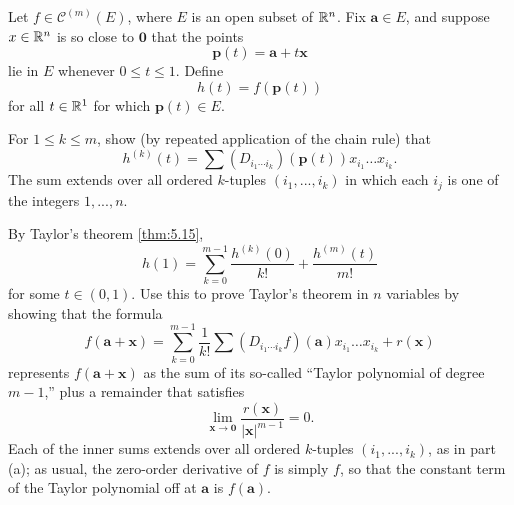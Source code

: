 \begin{myExercise}
    \label{ex:9.30}
    Let $f \in \mathscr{C}^{(m)} (E)$, 
    where $E$ is an open subset of ${\protect\mathbb R}^n$. 
    Fix $\mathbf{a} \in E$, and suppose $x \in {\protect\mathbb R}^n$ is so close to $\mathbf{0}$ that the points
    \begin{equation*}
        \mathbf{p}(t) = \mathbf{a} + t \mathbf{x}
    \end{equation*}
    lie in $E$ whenever $0 \leq t \leq 1$. 
    Define
    \begin{equation*}
        h(t) = f(\mathbf{p}(t))
    \end{equation*}
    for all $t \in {\protect\mathbb R}^1$ for which $\mathbf{p}(t) \in E$.
    \begin{asparaenum}[(a)]
        \item For $1 \leq k \leq m$, show (by repeated application of the chain rule) that 
        \begin{equation*}
            h^{(k)}(t) = \sum 
            \left( D_{i_1 \cdots i_k} \right) \left( \mathbf{p}(t) \right) 
            x_{i_1} \dots x_{i_k} .
        \end{equation*}
        The sum extends over all ordered $k$-tuples $(i_1, ... , i_k)$ in which each $i_j$ is one of the integers $1, ... , n$.
        \item By Taylor's theorem \ref{thm:5.15},
        \begin{equation*}
            h(1) = \sum_{k=0}^{m-1} \frac{h^{(k)}(0)}{k!} + \frac{h^{(m)}(t)}{m!}
        \end{equation*}
        for some $t \in (0, 1)$. 
        Use this to prove Taylor's theorem in $n$ variables by showing that the formula
        \begin{equation*}
            f(\mathbf{a+x}) = \sum_{k=0}^{m-1} \frac{1}{k!}
            \sum \left( D_{i_1 \cdots i_k} f \right)(\mathbf{a})
            x_{i_1} \dots x_{i_k} 
            + r(\mathbf{x})
        \end{equation*}
        represents $f(\mathbf{a + x})$ as the sum of its so-called ``Taylor polynomial of degree $m - 1$,'' plus a remainder that satisfies
        \begin{equation*}
            \lim_{\mathbf{x} \to \mathbf{0}} \frac{r(\mathbf{x})}{|\mathbf{x}|^{m-1}} = 0.
        \end{equation*}
        Each of the inner sums extends over all ordered $k$-tuples $(i_1, ... , i_k)$, as in part (a); 
        as usual, the zero-order derivative of $f$ is simply $f$, so that the constant term of the Taylor polynomial off at $\mathbf{a}$ is $f(\mathbf{a})$.

\end{asparaenum}
\end{myExercise}
